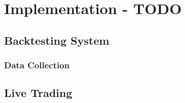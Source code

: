 \chapter{Implementation - TODO}

\section{Backtesting System}
\subsection{Data Collection}

\section{Live Trading}
